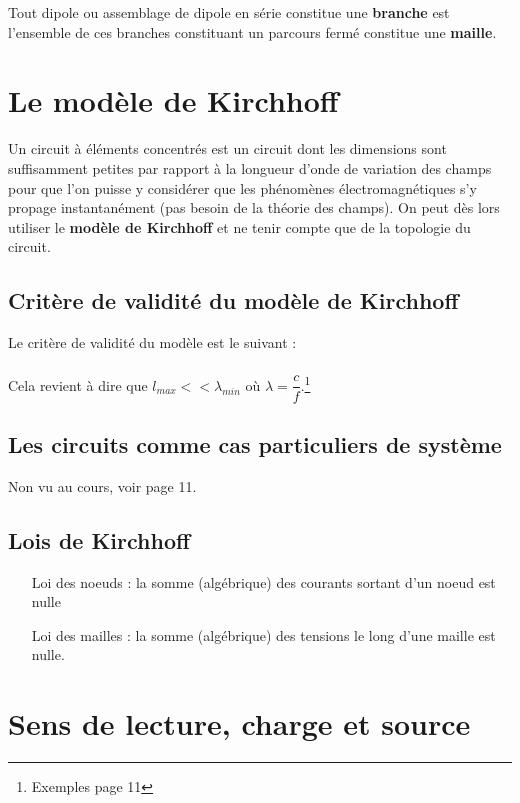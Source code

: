 \documentclass[11pt, a4paper, openany]{book}
\begin{document}
		Tout dipole ou assemblage de dipole en série constitue une \textbf{branche} est l'ensemble de ces branches constituant un parcours fermé constitue une \textbf{maille}.
		
		\section{Le modèle de Kirchhoff}
		Un circuit à éléments concentrés est un circuit dont les dimensions sont suffisamment petites par rapport à la longueur d'onde de variation des champs pour que l'on puisse y considérer que les phénomènes électromagnétiques s'y propage instantanément (pas besoin de la théorie des champs). On peut dès lors utiliser le \textbf{modèle de Kirchhoff} et ne tenir compte que de la topologie du circuit.
		
		\subsection{Critère de validité du modèle de Kirchhoff}
		Le critère de validité du modèle est le suivant :\\
		
		\ \\
		Cela revient à dire que $l_{max} << \lambda_{min}$ où $\lambda = \dfrac{c}{f}$.\footnote{Exemples page 11}
		
		\subsection{Les circuits comme cas particuliers de système}
		Non vu au cours, voir page 11.
		
		\subsection{Lois de Kirchhoff}
		\begin{itemize}
			\item[Loi des noeuds] : la somme (algébrique) des courants sortant d'un noeud est nulle
			\item[Loi des mailles] : la somme (algébrique) des tensions le long d'une maille est nulle.
		\end{itemize}
		
		\section{Sens de lecture, charge et source}
\end{document}
